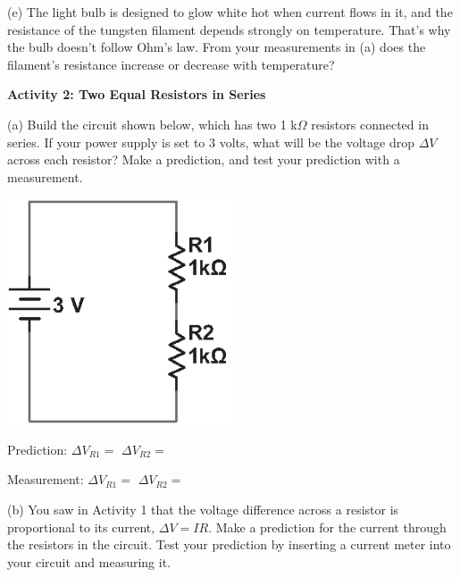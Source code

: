 (e) The light bulb is designed to glow white hot when current flows in it, and the resistance of the tungsten filament depends strongly on temperature.  That's why the bulb doesn’t follow Ohm's law.  From your measurements in (a) does the filament's resistance increase or decrease with temperature?
\vspace{0.6 in}

\textbf{Activity 2: Two Equal Resistors in Series} \par
\nopagebreak
(a) Build the circuit shown below, which has two 1 k$\Omega$ resistors connected in series.  If your power supply is set to 3 volts, what will be the voltage drop $\Delta V$ across each resistor?  Make a prediction, and test your prediction with a measurement.

\begin{minipage}{0.4\textwidth} 
\hspace{0.5in}\includegraphics[width=0.5\textwidth]{electric_circuits2/circ_diag2_bw.eps}
\end{minipage}
\begin{minipage}{0.6\textwidth} 
\vspace{0.2 in}
Prediction: \hspace{0.4 in} $\Delta V_{R1} =$ \hspace{0.8 in} $\Delta V_{R2}=$
\vspace{0.2 in}

Measurement: \hspace{0.2 in} $\Delta V_{R1} =$ \hspace{0.8 in} $\Delta V_{R2}=$ 
\vspace{0.2 in}
\end{minipage}

(b) You saw in Activity 1 that the voltage difference across a resistor is proportional to its current, $\Delta V=IR$.  Make a prediction for the current through the resistors in the circuit.  Test your prediction by inserting a current meter into your circuit and measuring it.  

